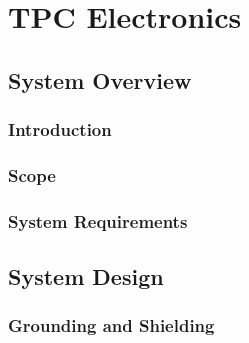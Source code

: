 \chapter{TPC Electronics}
\label{ch:fdsp-tpc-elec}


\section{System Overview}
\label{sec:fdsp-tpc-elec-ov}


\subsection{Introduction}
\label{sec:fdsp-tpc-elec-ov-intro}


\subsection{Scope}
\label{sec:fdsp-tpc-elec-ov-scope}


\subsection{System Requirements}
\label{sec:fdsp-tpc-elec-ov-req}



\section{System Design}
\label{sec:fdsp-tpc-elec-design}


\subsection{Grounding and Shielding}
\label{sec:fdsp-tpc-elec-design-ground}


